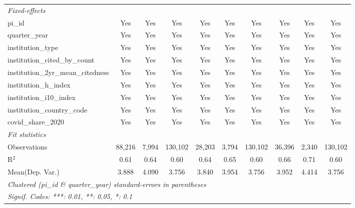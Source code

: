 \begin{tabular}{lccccccccc}
   \midrule
   \emph{Fixed-effects}\\
   pi\_id                                                      & Yes           & Yes           & Yes           & Yes           & Yes            & Yes           & Yes           & Yes            & Yes\\  
   quarter\_year                                               & Yes           & Yes           & Yes           & Yes           & Yes            & Yes           & Yes           & Yes            & Yes\\  
   institution\_type                                           & Yes           & Yes           & Yes           & Yes           & Yes            & Yes           & Yes           & Yes            & Yes\\  
   institution\_cited\_by\_count                               & Yes           & Yes           & Yes           & Yes           & Yes            & Yes           & Yes           & Yes            & Yes\\  
   institution\_2yr\_mean\_citedness                           & Yes           & Yes           & Yes           & Yes           & Yes            & Yes           & Yes           & Yes            & Yes\\  
   institution\_h\_index                                       & Yes           & Yes           & Yes           & Yes           & Yes            & Yes           & Yes           & Yes            & Yes\\  
   institution\_i10\_index                                     & Yes           & Yes           & Yes           & Yes           & Yes            & Yes           & Yes           & Yes            & Yes\\  
   institution\_country\_code                                  & Yes           & Yes           & Yes           & Yes           & Yes            & Yes           & Yes           & Yes            & Yes\\  
   covid\_share\_2020                                          & Yes           & Yes           & Yes           & Yes           & Yes            & Yes           & Yes           & Yes            & Yes\\  
   \midrule
   \emph{Fit statistics}\\
   Observations                                                & 88,216        & 7,994         & 130,102       & 28,203        & 3,794          & 130,102       & 36,396        & 2,340          & 130,102\\  
   R$^2$                                                       & 0.61          & 0.64          & 0.60          & 0.64          & 0.65           & 0.60          & 0.66          & 0.71           & 0.60\\  
Mean(Dep. Var.) & 3.888 & 4.090 & 3.756 & 3.840 & 3.954 & 3.756 & 3.952 & 4.414 & 3.756 \\
   \midrule \midrule
   \multicolumn{10}{l}{\emph{Clustered (pi\_id \& quarter\_year) standard-errors in parentheses}}\\
   \multicolumn{10}{l}{\emph{Signif. Codes: ***: 0.01, **: 0.05, *: 0.1}}\\
\end{tabular}
\par\endgroup
